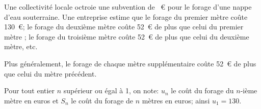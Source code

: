 \bigskip

Une collectivité locale octroie une subvention de ~\euro{} pour le forage d'une nappe d'eau souterraine. Une entreprise estime que le forage du premier mètre coûte 130~\euro; le
forage du deuxième mètre coûte 52~\euro{} de plus que celui du premier mètre ; le forage du
troisième mètre coûte 52~\euro{} de plus que celui du deuxième mètre, etc.

Plus généralement, le forage de chaque mètre supplémentaire coûte 52~\euro{} de plus que celui
du mètre précédent.

Pour tout entier $n$ supérieur ou égal à 1, on note: $u_n$ le coût du forage du $n$-ième mètre en
euros et $S_n$ le coût du forage de $n$ mètres en euros; ainsi $u_1=130$.

\medskip

